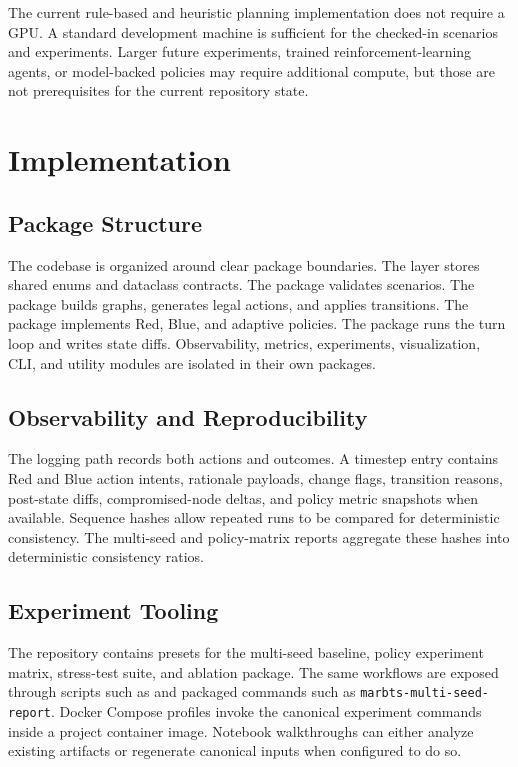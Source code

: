 \documentclass[conference]{IEEEtran}
\begin{document}
The current rule-based and heuristic planning implementation does not require a GPU. A standard development machine is sufficient for the checked-in scenarios and experiments. Larger future experiments, trained reinforcement-learning agents, or model-backed policies may require additional compute, but those are not prerequisites for the current repository state.

\section{Implementation}
\subsection{Package Structure}
The codebase is organized around clear package boundaries. The  layer stores shared enums and dataclass contracts. The  package validates scenarios. The  package builds graphs, generates legal actions, and applies transitions. The  package implements Red, Blue, and adaptive policies. The  package runs the turn loop and writes state diffs. Observability, metrics, experiments, visualization, CLI, and utility modules are isolated in their own packages.

\subsection{Observability and Reproducibility}
The logging path records both actions and outcomes. A timestep entry contains Red and Blue action intents, rationale payloads, change flags, transition reasons, post-state diffs, compromised-node deltas, and policy metric snapshots when available. Sequence hashes allow repeated runs to be compared for deterministic consistency. The multi-seed and policy-matrix reports aggregate these hashes into deterministic consistency ratios.

\subsection{Experiment Tooling}
The repository contains presets for the multi-seed baseline, policy experiment matrix, stress-test suite, and ablation package. The same workflows are exposed through scripts such as  and packaged commands such as \texttt{marbts-multi-seed-report}. Docker Compose profiles invoke the canonical experiment commands inside a project container image. Notebook walkthroughs can either analyze existing artifacts or regenerate canonical inputs when configured to do so.
\end{document}
